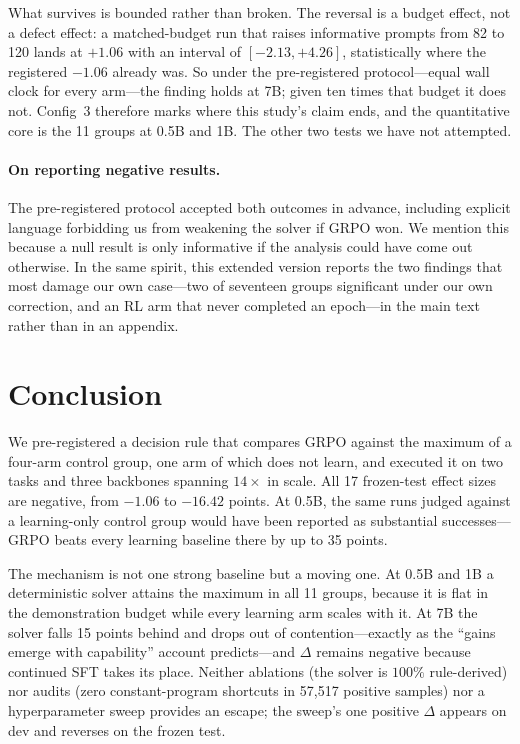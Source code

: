 What survives is bounded rather than broken. The reversal is a budget effect,
not a defect effect: a matched-budget run that raises informative prompts from
82 to 120 lands at $+1.06$ with an interval of $[-2.13,+4.26]$, statistically
where the registered $-1.06$ already was. So under the pre-registered
protocol---equal wall clock for every arm---the finding holds at 7B; given ten
times that budget it does not. Config~3 therefore marks where this study's claim
ends, and the quantitative core is the 11 groups at 0.5B and 1B. The other two
tests we have not attempted.

\paragraph{On reporting negative results.}
The pre-registered protocol accepted both outcomes in advance, including
explicit language forbidding us from weakening the solver if GRPO won. We
mention this because a null result is only informative if the analysis could
have come out otherwise. In the same spirit, this extended version reports the
two findings that most damage our own case---two of seventeen groups significant
under our own correction, and an RL arm that never completed an epoch---in the
main text rather than in an appendix.

\section{Conclusion}

We pre-registered a decision rule that compares GRPO against the maximum of a
four-arm control group, one arm of which does not learn, and executed it on two
tasks and three backbones spanning $14\times$ in scale. All 17 frozen-test
effect sizes are negative, from $-1.06$ to $-16.42$ points. At 0.5B, the same
runs judged against a learning-only control group would have been reported as
substantial successes---GRPO beats every learning baseline there by up to 35
points.

The mechanism is not one strong baseline but a moving one. At 0.5B and 1B a
deterministic solver attains the maximum in all 11 groups, because it is flat in
the demonstration budget while every learning arm scales with it. At 7B the
solver falls 15 points behind and drops out of contention---exactly as the
``gains emerge with capability'' account predicts---and $\Delta$ remains negative
because continued SFT takes its place. Neither ablations (the solver is $100\%$
rule-derived) nor audits (zero constant-program shortcuts in 57{,}517 positive
samples) nor a hyperparameter sweep provides an escape; the sweep's one positive
$\Delta$ appears on dev and reverses on the frozen test.

